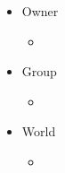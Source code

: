 \documentclass[12pt]{article}
\begin{document}
\begin{enumerate}[lable=Q4.\arabic*]
			\begin{itemize}
				\item Owner
					\begin{itemize}
						\item 
					\end{itemize}
				\item Group
					\begin{itemize}
						\item 
					\end{itemize}
				\item World
					\begin{itemize}
						\item 
					\end{itemize}
			\end{itemize}
	\end{enumerate}
\end{document}
